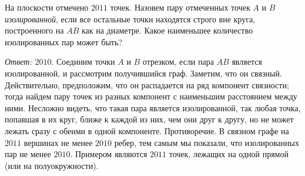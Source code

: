 \problem
На плоскости отмечено $2011$ точек.
Назовем пару отмеченных точек $A$ и $B$ \emph{изолированной}, если все остальные
точки находятся строго вне круга, построенного на $AB$ как на диаметре.
Какое наименьшее количество изолированных пар может быть?

\solution
\emph{Ответ:} $2010$.
Соединим точки $A$ и $B$ отрезком, если пара $AB$ является изолированной, и
рассмотрим получившийся граф.
Заметим, что он связный.
Действительно, предположим, что он распадается на ряд компонент связности;
тогда найдем пару точек из разных компонент с наименьшим расстоянием между
ними.
Несложно видеть, что такая пара является изолированной, так любая точка,
попавшая в их круг, ближе к каждой из них, чем они друг к другу, но не может
лежать сразу с обеими в одной компоненте.
Противоречие.
В связном графе на $2011$ вершинах не менее $2010$ ребер, тем самым мы
показали, что изолированных пар не менее $2010$.
Примером являются $2011$ точек, лежащих на одной прямой (или на
полуокружности).

\endproblem
